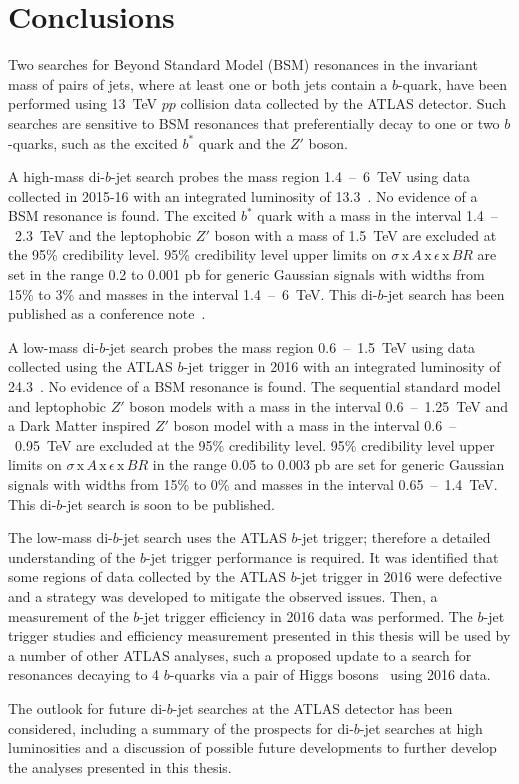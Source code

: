 \chapter{Conclusions}
\label{sec:conc}

Two searches for Beyond Standard Model (BSM) resonances in the invariant mass of pairs of jets,
where at least one or both jets contain a $b$-quark,
have been performed using 13~TeV $pp$ collision data collected by the ATLAS detector.
Such searches are sensitive to BSM resonances that preferentially decay to one or two $b$-quarks, such as the excited $b^*$ quark and the $Z'$ boson.


A high-mass di-$b$-jet search probes the mass region 1.4~--~6~TeV
using data collected in 2015-16 with an integrated luminosity of 13.3~\ifb{}.
No evidence of a BSM resonance is found.
The excited $b^*$ quark with a mass in the interval 1.4~--~2.3~TeV
and the leptophobic $Z'$ boson with a mass of 1.5~TeV are excluded at the 95\% credibility level.
95\% credibility level upper limits on $\sigma\,\text{x}\,\mathit{A}\,\text{x}\,\epsilon\,\text{x}\,\mathit{BR}$
are set in the range 0.2 to 0.001 pb for generic Gaussian signals with widths from 15\% to 3\% and masses in the interval 1.4~--~6~TeV.
This di-$b$-jet search has been published as a conference note~\cite{dibjet-ichep_conf}.

A low-mass di-$b$-jet search probes the mass region 0.6~--~1.5~TeV
using data collected using the ATLAS $b$-jet trigger in 2016 with an integrated luminosity of 24.3~\ifb{}.
No evidence of a BSM resonance is found.
The sequential standard model and leptophobic $Z'$  boson models with a mass in the interval 0.6~--~1.25~TeV
and a Dark Matter inspired $Z'$ boson model with a mass in the interval 0.6~--~0.95~TeV are excluded at the 95\% credibility level.
95\% credibility level upper limits on $\sigma\,\text{x}\,\mathit{A}\,\text{x}\,\epsilon\,\text{x}\,\mathit{BR}$ in the range 0.05 to 0.003 pb
are set for generic Gaussian signals with widths from 15\% to 0\% and masses in the interval 0.65~--~1.4~TeV.
This di-$b$-jet search is soon to be published.

The low-mass di-$b$-jet search uses the ATLAS $b$-jet trigger; therefore a detailed understanding of the $b$-jet trigger performance is required.
It was identified that some regions of data collected by the ATLAS $b$-jet trigger in 2016 were defective
and a strategy was developed to mitigate the observed issues.
Then, a measurement of the $b$-jet trigger efficiency in 2016 data was performed.
The $b$-jet trigger studies and efficiency measurement presented in this thesis will be used by a number of other ATLAS analyses,
such a proposed update to a search for resonances decaying to 4 $b$-quarks via a pair of Higgs bosons~\cite{trig-H4b} using 2016 data.

The outlook for future di-$b$-jet searches at the ATLAS detector has been considered,
including a summary of the prospects for di-$b$-jet searches at high luminosities
and a discussion of possible future developments to further develop the analyses presented in this thesis.


